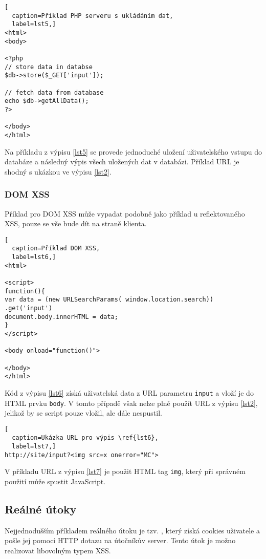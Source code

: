\documentclass[11pt, conference, a4paper]{IEEEtran}
\begin{document}
\begin{lstlisting}[
  caption=Příklad PHP serveru s ukládáním dat,
  label=lst5,]
<html>
<body>

<?php
// store data in databse
$db->store($_GET['input']);

// fetch data from database
echo $db->getAllData();
?>

</body>
</html>
\end{lstlisting}

Na příkladu z výpisu \ref{lst5} se provede jednoduché uložení uživatelského vstupu do databáze a následný výpis všech uložených dat v databázi. Příklad URL je shodný s ukázkou ve výpisu \ref{lst2}.

\subsubsection{DOM XSS}
Příklad pro DOM XSS může vypadat podobně jako příklad u reflektovaného XSS, pouze se vše bude dít na straně klienta. 

\begin{lstlisting}[
  caption=Příklad DOM XSS,
  label=lst6,]
<html>

<script>
function(){
var data = (new URLSearchParams( window.location.search)) .get('input')
document.body.innerHTML = data;
}
</script>

<body onload="function()">

</body>
</html>
\end{lstlisting}

Kód z výpisu \ref{lst6} získá uživatelská data z URL parametru \texttt{input} a vloží je do HTML prvku \texttt{body}. V tomto případě však nelze plně použít URL z výpisu \ref{lst2}, jelikož by se script pouze vložil, ale dále nespustil. 

\begin{lstlisting}[
  caption=Ukázka URL pro výpis \ref{lst6},
  label=lst7,]
http://site/input?<img src=x onerror="MC">
\end{lstlisting}

V příkladu URL z výpisu \ref{lst7} je použit HTML tag \texttt{img}, který při správném použití může spustit JavaScript. 


\subsection{Reálné útoky}
Nejjednodušším příkladem reálného útoku je tzv. , který získá cookies uživatele a pošle jej pomocí HTTP dotazu na útočníkův server. Tento útok je možno realizovat libovolným typem XSS.
\end{document}
